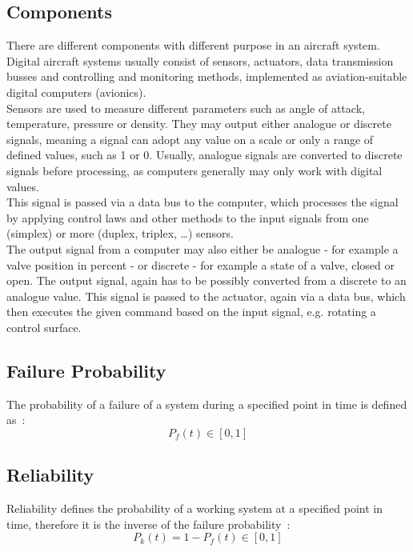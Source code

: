\subsection{Components}\label{subsec:components}
There are different components with different purpose in an aircraft system.
Digital aircraft systems usually consist of sensors, actuators, data transmission busses and controlling and monitoring methods, implemented
as aviation-suitable digital computers (avionics).
\\
Sensors are used to measure different parameters such as angle of attack, temperature, pressure or density.
They may output either analogue or discrete signals, meaning a signal can adopt any value on a scale or only a range of defined values,
such as 1 or 0.
Usually, analogue signals are converted to discrete signals before processing, as computers generally may only work with digital
values.
\\
This signal is passed via a data bus to the computer, which processes the signal by applying control laws and other methods to the
input signals from one (simplex) or more (duplex, triplex, \ldots) sensors.
\\
The output signal from a computer may also either be analogue - for example a valve position in percent - or discrete - for
example a state of a valve, closed or open.
The output signal, again has to be possibly converted from a discrete to an analogue value.
This signal is passed to the actuator, again via a data bus, which then executes the given command based on the input signal, e.g.
rotating a control surface.


\subsection{Failure Probability}\label{subsec:failure-probability}
The probability of a failure of a system during a specified point in time is defined as~\cite{lfs2}:
\begin{equation}
    \label{eq:failure-probability}
    P_f(t) \in [0,1]
\end{equation}
\subsection{Reliability}\label{subsec:reliability}
Reliability defines the probability of a working system at a specified point in time,
therefore it is the inverse of the failure probability~\cite{lfs2}:
\begin{equation}
    \label{eq:reliability}
    P_k(t) = 1 - P_f(t) \in [0,1]
\end{equation}
